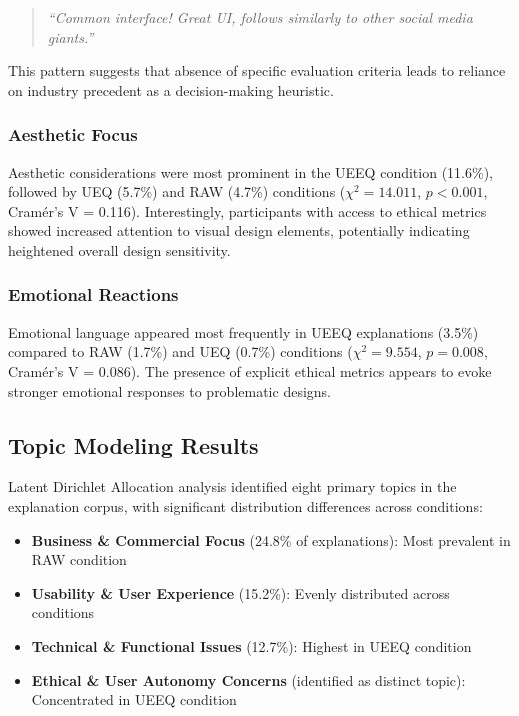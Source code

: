 \begin{quote}
\textit{``Common interface! Great UI, follows similarly to other social media giants.''}
\end{quote}

This pattern suggests that absence of specific evaluation criteria leads to reliance on industry precedent as a decision-making heuristic.

\subsubsection{Aesthetic Focus}
Aesthetic considerations were most prominent in the UEEQ condition (11.6\%), followed by UEQ (5.7\%) and RAW (4.7\%) conditions ($\chi^2 = 14.011$, $p < 0.001$, Cramér's V = 0.116). Interestingly, participants with access to ethical metrics showed increased attention to visual design elements, potentially indicating heightened overall design sensitivity.

\subsubsection{Emotional Reactions}
Emotional language appeared most frequently in UEEQ explanations (3.5\%) compared to RAW (1.7\%) and UEQ (0.7\%) conditions ($\chi^2 = 9.554$, $p = 0.008$, Cramér's V = 0.086). The presence of explicit ethical metrics appears to evoke stronger emotional responses to problematic designs.

\subsection{Topic Modeling Results}

Latent Dirichlet Allocation analysis identified eight primary topics in the explanation corpus, with significant distribution differences across conditions:

\begin{itemize}
\item \textbf{Business \& Commercial Focus} (24.8\% of explanations): Most prevalent in RAW condition
\item \textbf{Usability \& User Experience} (15.2\%): Evenly distributed across conditions  
\item \textbf{Technical \& Functional Issues} (12.7\%): Highest in UEEQ condition
\item \textbf{Ethical \& User Autonomy Concerns} (identified as distinct topic): Concentrated in UEEQ condition
\end{itemize}

